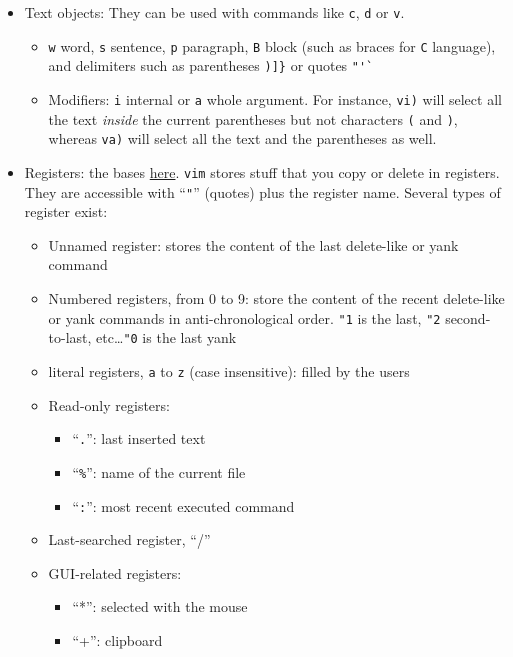 \documentclass[a4paper,12pt,%
              final%
              ]{article}
\newcommand{\vim}{\texttt{vim}}
\begin{document}
\begin{itemize}
  \item Text objects: They can be used with commands like \texttt{c}, \texttt{d} or
    \texttt{v}.
    \begin{itemize}
      \item \texttt{w} word, \texttt{s} sentence, \texttt{p} paragraph, \texttt{B}
        block (such as braces for \texttt{C} language), and delimiters such as
        parentheses \verb|)]}| or quotes \verb|"'`|
      \item Modifiers: \texttt{i} internal or \texttt{a} whole argument. For
        instance, \texttt{vi)} will select all the text \emph{inside} the current
        parentheses but not characters \texttt{(} and \texttt{)}, whereas
        \texttt{va)} will select all the text and the parentheses as well.
    \end{itemize}
  \item Registers: the bases \href{https://www.brianstorti.com/vim-registers/}{here}.
    \vim{} stores stuff that you copy or delete in registers. They are accessible
    with ``\texttt{"}'' (quotes) plus the register name. Several types of register
    exist:
    \begin{itemize}
      \item Unnamed register: stores the content of the last delete-like or yank
        command
      \item Numbered registers, from 0 to 9: store the content of the recent
        delete-like or yank commands in anti-chronological order. \texttt{"1} is the
        last, \texttt{"2} second-to-last, etc\ldots \texttt{"0} is the last yank
      \item literal registers, \texttt{a} to \texttt{z} (case insensitive): filled by
        the users
      \item Read-only registers:
        \begin{itemize}
          \item ``\texttt{.}'': last inserted text
          \item ``\verb!%!'': name of the current file
          \item ``\texttt{:}'': most recent executed command
        \end{itemize}
      \item Last-searched register, ``/''
      \item GUI-related registers:
        \begin{itemize}
          \item ``*'': selected with the mouse
          \item ``+'': clipboard

\end{itemize}
\end{itemize}
\end{itemize}
\end{document}
